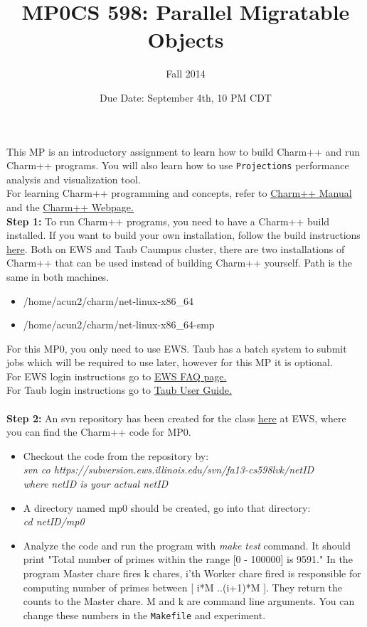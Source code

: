 \documentclass{article}
\title{MP0}
\title{CS 598: Parallel Migratable Objects}
\author{Fall 2014}
\date{Due Date: September 4th, 10 PM CDT}
\begin{document}
\maketitle

This MP is an introductory assignment to learn how to build Charm++ and run
Charm++ programs. You will also learn how to use \texttt{Projections}
performance analysis and visualization tool. \\

For learning Charm++ programming and concepts, refer to
\href{http://charm.cs.illinois.edu/manuals/html/charm++/}{Charm++ Manual} and
the \href{http://charmplusplus.org/}{Charm++ Webpage.}\\

\textbf{Step 1:} To run Charm++ programs, you need to have a Charm++ build
installed. If you want to build your own installation, follow the build
instructions \href{http://charm.cs.illinois.edu/manuals/html/charm++/A.html}{here}. Both
on EWS and Taub Caumpus cluster, there are two installations of Charm++ that can
be used instead of building Charm++ yourself. Path is the same in both machines. 
\begin{itemize}
\item /home/acun2/charm/net-linux-x86\_64
\item /home/acun2/charm/net-linux-x86\_64-smp\\
\end{itemize}
For this MP0, you only need to use EWS. Taub has a batch
system to submit jobs which will be required to use later, however for this MP
it is optional.\\
For EWS login instructions go to
\href{http://it.engineering.illinois.edu/ews/lab-information/ews-faq}{EWS FAQ
page.} \\
For Taub login instructions go to
\href{https://campuscluster.illinois.edu/user\_info/doc/}{Taub User Guide.} \\
\\
\textbf{Step 2:} An svn repository has been created for the class
\href{https://subversion.ews.illinois.edu/svn/fa13-cs598lvk/}{here} at EWS, where you can find the Charm++ code for MP0. \\
\begin{itemize}
\item Checkout the code from the repository by: \\
        \textit{svn co
        https://subversion.ews.illinois.edu/svn/fa13-cs598lvk/netID \\
        where netID is your actual netID}
\item A directory named mp0 should be created, go into that directory: \\
        \textit{cd netID/mp0}
\item Analyze the code and run the program with \textit{make test} command.
It should print "Total number of primes within the range [0 - 100000] is 9591." In the program Master chare fires k chares, i'th Worker chare fired is responsible for
computing number of primes between [ i*M ..(i+1)*M ]. They return the counts to
the Master chare. M and k are command line arguments. You can change these numbers in the \texttt{Makefile} and experiment.

\end{itemize}
\end{document}
